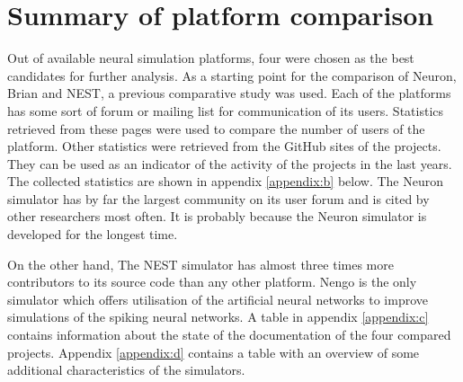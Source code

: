 \section{Summary of platform comparison}
Out of available neural simulation platforms, four were chosen as the best candidates for further analysis. As a starting point for the comparison of Neuron, Brian and NEST, a previous comparative study \cite{tikidji-hamburyanSoftwareBrainNetwork2017} was used. Each of the platforms has some sort of forum or mailing list for communication of its users. Statistics retrieved from these pages were used to compare the number of users of the platform. Other statistics were retrieved from the GitHub sites of the projects. They can be used as an indicator of the activity of the projects in the last years. The collected statistics are shown in appendix \ref{appendix:b} below. The Neuron simulator has by far the largest community on its user forum and is cited by other researchers most often. It is probably because the Neuron simulator is developed for the longest time. \par
On the other hand, The NEST simulator has almost three times more contributors to its source code than any other platform. Nengo is the only simulator which offers utilisation of the artificial neural networks to improve simulations of the spiking neural networks. A table in appendix \ref{appendix:c} contains information about the state of the documentation of the four compared projects. Appendix \ref{appendix:d} contains a table with an overview of some additional characteristics of the simulators.
